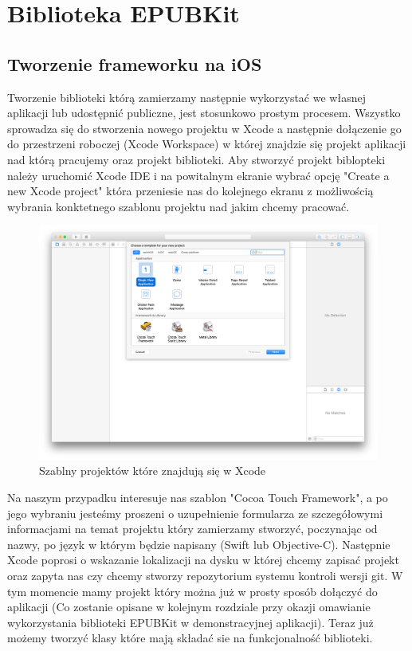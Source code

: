 \chapter{Biblioteka EPUBKit}
\section{Tworzenie frameworku na iOS}

Tworzenie biblioteki którą zamierzamy następnie wykorzystać we własnej aplikacji lub udostępnić publiczne, jest stosunkowo prostym procesem. Wszystko sprowadza się do stworzenia nowego projektu w Xcode a następnie dołączenie go do przestrzeni roboczej (Xcode Workspace) w której znajdzie się projekt aplikacji nad którą pracujemy oraz projekt biblioteki. Aby stworzyć projekt biblopteki należy uruchomić Xcode IDE i na powitalnym ekranie wybrać opcję "Create a new Xcode project" która przeniesie nas do kolejnego ekranu z możliwością wybrania konktetnego szablonu projektu nad jakim chcemy pracować.

\begin{figure}[ht!]
  \centering
  \includegraphics[width=120mm]{images/chapter-4-image-1-new-project.png}
  \caption{Szablny projektów które znajdują się w Xcode}
  \label{chapter-4-image-1-new-project}
\end{figure}

Na naszym przypadku interesuje nas szablon "Cocoa Touch Framework", a po jego wybraniu jesteśmy proszeni o uzupełnienie formularza ze szczegółowymi informacjami na temat projektu który zamierzamy stworzyć, poczynając od nazwy, po język w którym będzie napisany (Swift lub Objective-C). Następnie Xcode poprosi o wskazanie lokalizacji na dysku w której chcemy zapisać projekt oraz zapyta nas czy chcemy stworzy repozytorium systemu kontroli wersji git. W tym momencie mamy projekt który można już w prosty sposób dołączyć do aplikacji (Co zostanie opisane w kolejnym rozdziale przy okazji omawianie wykorzystania biblioteki EPUBKit w demonstracyjnej aplikacji). Teraz już możemy tworzyć klasy które mają składać sie na funkcjonalność biblioteki.


